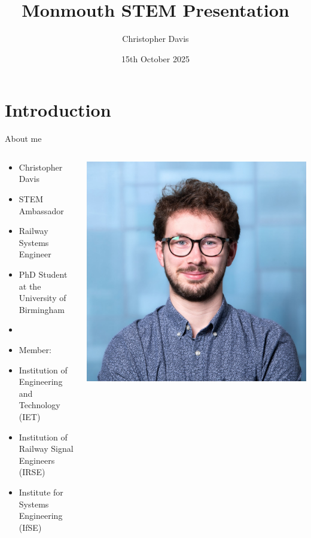 \documentclass[
    aspectratio=169
]{beamer}
\title{Monmouth STEM Presentation}
\date{15th October 2025}
\author{Christopher Davis}
\begin{document}
\begin{frame}
\titlepage
\end{frame}

\section{Introduction}

\begin{frame}{About me}
	\begin{columns}[T] %
		\begin{column}{0.5\textwidth}
			\begin{itemize}
				\item Christopher Davis
				\item STEM Ambassador
				\item Railway Systems Engineer
				\item PhD Student at the University of Birmingham
				\item 
				\item Member:
				\item Institution of Engineering and Technology (IET)
				\item Institution of Railway Signal Engineers (IRSE)
				\item Institute for Systems Engineering (IfSE)
				
			\end{itemize}
		\end{column}
		
		\begin{column}{0.5\textwidth}
			\includegraphics[width=\textwidth]{images/headshot.jpeg}
		\end{column}
	\end{columns}
	
\end{frame}
\end{document}
